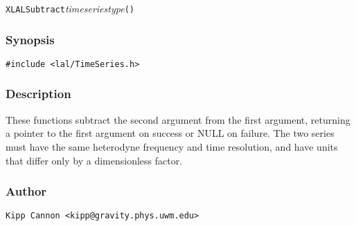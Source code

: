 \texttt{XLALSubtract}\textit{timeseriestype}\texttt{()}

\subsubsection{Synopsis}

\begin{verbatim}
#include <lal/TimeSeries.h>
\end{verbatim}


\subsubsection{Description}

These functions subtract the second argument from the first argument,
returning a pointer to the first argument on success or NULL on failure.
The two series must have the same heterodyne frequency and time resolution,
and have units that differ only by a dimensionless factor.

\subsubsection{Author}

\verb|Kipp Cannon <kipp@gravity.phys.uwm.edu>|
